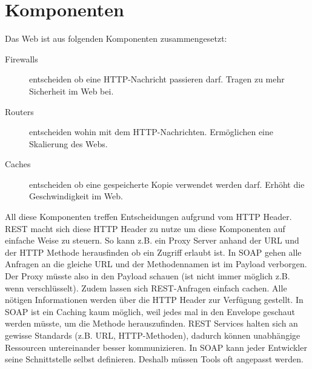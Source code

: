 \section{Komponenten}

Das Web ist aus folgenden Komponenten zusammengesetzt:
\begin{description}
	\item[Firewalls] entscheiden ob eine HTTP-Nachricht passieren darf. Tragen zu mehr Sicherheit im Web bei.
	\item[Routers] entscheiden wohin mit dem HTTP-Nachrichten. Ermöglichen eine Skalierung des Webs.
	\item[Caches] entscheiden ob eine gespeicherte Kopie verwendet werden darf. Erhöht die Geschwindigkeit im Web.
\end{description}
All diese Komponenten treffen Entscheidungen aufgrund vom HTTP Header. REST macht sich diese HTTP Header zu nutze um diese Komponenten auf einfache Weise zu steuern. So kann z.B. ein Proxy Server anhand der URL und der HTTP Methode herausfinden ob ein Zugriff erlaubt ist. In SOAP gehen alle Anfragen an die gleiche URL und der Methodennamen ist im Payload verborgen. Der Proxy müsste also in den Payload schauen (ist nicht immer möglich z.B. wenn verschlüsselt).
Zudem lassen sich REST-Anfragen einfach cachen. Alle nötigen Informationen werden über die HTTP Header zur Verfügung gestellt. In SOAP ist ein Caching kaum möglich, weil jedes mal in den Envelope geschaut werden müsste, um die Methode herauszufinden. 
REST Services halten sich an gewisse Standards (z.B. URL, HTTP-Methoden), dadurch können unabhängige Ressourcen untereinander besser kommunizieren. In SOAP kann jeder Entwickler seine Schnittstelle selbst definieren. Deshalb müssen Tools oft angepasst werden. 